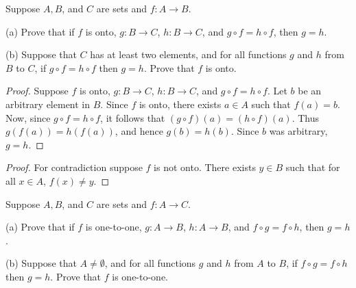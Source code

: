 \begin{tcolorbox}[title=Problem 20, breakable]
    Suppose $A, B$, and $C$ are sets and $f : A \rightarrow B$.

    (a) Prove that if $f$ is onto, $g : B \rightarrow C$, 
        $h : B \rightarrow C$, and $g \circ f = h \circ f$,
        then $g = h$.

    (b) Suppose that $C$ has at least two elements,
        and for all functions $g$ and $h$ from $B$ to $C$,
        if $g \circ f = h \circ f$ then $g = h$.
        Prove that $f$ is onto.
\end{tcolorbox}

\begin{proof}
    Suppose $f$ is onto, $g : B \rightarrow C$, 
        $h : B \rightarrow C$, and $g \circ f = h \circ f$.
    Let $b$ be an arbitrary element in $B$.
    Since $f$ is onto, there exists $a \in A$ such that $f(a) = b$.
    Now, since $g \circ f = h \circ f$, it follows that
        $(g \circ f)(a) = (h \circ f)(a)$.
    Thus $g(f(a)) = h(f(a))$, and hence $g(b) = h(b)$.
    Since $b$ was arbitrary, $g = h$.
\end{proof}

\begin{proof}
    For contradiction suppose $f$ is not onto.
    There exists $y \in B$ such that for all $x \in A$,
        $f(x) \ne y$.
\end{proof}

\begin{tcolorbox}[title=Problem 21, breakable]
     Suppose $A, B$, and $C$ are sets and $f : A \rightarrow C$.

     (a) Prove that if $f$ is one-to-one, $g : A \rightarrow B$,
         $h : A \rightarrow B$, and $f \circ g = f \circ h$, then $g = h$.

    (b) Suppose that $A \ne \emptyset$, and for all functions $g$ and $h$
        from $A$ to $B$, if $f \circ g = f \circ h$ then $g = h$.
        Prove that $f$ is one-to-one.
\end{tcolorbox}

